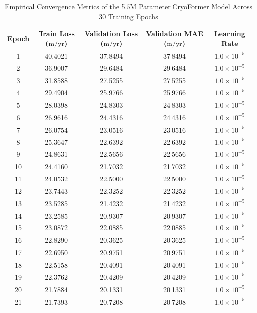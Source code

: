 \documentclass{mnnit}
\begin{document}
\begin{table}[ht]
\centering
\caption{Empirical Convergence Metrics of the 5.5M Parameter CryoFormer Model Across 30 Training Epochs}
\label{tab:cryoformer_epochs}
\small
\begin{tabular*}{\textwidth}{@{\extracolsep{\fill}}ccccc}
\toprule
\textbf{Epoch} & \textbf{Train Loss ($\text{m/yr}$)} & \textbf{Validation Loss ($\text{m/yr}$)} & \textbf{Validation MAE ($\text{m/yr}$)} & \textbf{Learning Rate} \\
\midrule
1  & 40.4021 & 37.8494 & 37.8494 & $1.0 \times 10^{-5}$ \\
2  & 36.9007 & 29.6484 & 29.6484 & $1.0 \times 10^{-5}$ \\
3  & 31.8588 & 27.5255 & 27.5255 & $1.0 \times 10^{-5}$ \\
4  & 29.4904 & 25.9766 & 25.9766 & $1.0 \times 10^{-5}$ \\
5  & 28.0398 & 24.8303 & 24.8303 & $1.0 \times 10^{-5}$ \\
6  & 26.9616 & 24.4316 & 24.4316 & $1.0 \times 10^{-5}$ \\
7  & 26.0754 & 23.0516 & 23.0516 & $1.0 \times 10^{-5}$ \\
8  & 25.3647 & 22.6392 & 22.6392 & $1.0 \times 10^{-5}$ \\
9  & 24.8631 & 22.5656 & 22.5656 & $1.0 \times 10^{-5}$ \\
10 & 24.4160 & 21.7032 & 21.7032 & $1.0 \times 10^{-5}$ \\
11 & 24.0532 & 22.5000 & 22.5000 & $1.0 \times 10^{-5}$ \\
12 & 23.7443 & 22.3252 & 22.3252 & $1.0 \times 10^{-5}$ \\
13 & 23.5285 & 21.4232 & 21.4232 & $1.0 \times 10^{-5}$ \\
14 & 23.2585 & 20.9307 & 20.9307 & $1.0 \times 10^{-5}$ \\
15 & 23.0872 & 22.0885 & 22.0885 & $1.0 \times 10^{-5}$ \\
16 & 22.8290 & 20.3625 & 20.3625 & $1.0 \times 10^{-5}$ \\
17 & 22.6950 & 20.9751 & 20.9751 & $1.0 \times 10^{-5}$ \\
18 & 22.5158 & 20.4091 & 20.4091 & $1.0 \times 10^{-5}$ \\
19 & 22.3762 & 20.4209 & 20.4209 & $1.0 \times 10^{-5}$ \\
20 & 21.7884 & 20.1331 & 20.1331 & $1.0 \times 10^{-5}$ \\
21 & 21.7393 & 20.7208 & 20.7208 & $1.0 \times 10^{-5}$ \\

\end{tabular*}
\end{table}
\end{document}
